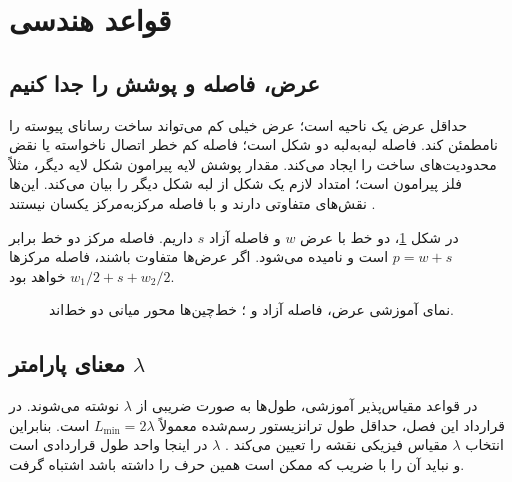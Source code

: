 \section{قواعد هندسی }
\label{sec:layout-rules}
\subsection{عرض، فاصله و پوشش را جدا کنیم}
 حداقل عرض یک ناحیه است؛ عرض خیلی کم می‌تواند ساخت
رسانای پیوسته را نامطمئن کند.
 فاصله لبه‌به‌لبه دو شکل است؛ فاصله کم خطر اتصال
ناخواسته یا نقض محدودیت‌های ساخت را ایجاد می‌کند.
 مقدار پوشش لایه پیرامون شکل لایه دیگر، مثلاً فلز پیرامون
 است؛  امتداد لازم یک شکل از لبه شکل دیگر را بیان می‌کند.
این‌ها نقش‌های متفاوتی دارند و با فاصله مرکزبه‌مرکز یکسان نیستند
\cite[بخش ]{weste}.

در شکل \ref{fig:layout-spacing}، دو خط با عرض \(w\) و فاصله آزاد \(s\)
داریم. فاصله مرکز دو خط برابر \(p=w+s\) است و  نامیده می‌شود.
اگر عرض‌ها متفاوت باشند، فاصله مرکزها \(w_1/2+s+w_2/2\) خواهد بود.

\begin{figure}[ht]
\centering
\begin{latin}
\end{latin}
\caption{نمای آموزشی عرض، فاصله آزاد و ؛ خط‌چین‌ها محور میانی دو خط‌اند.}
\label{fig:layout-spacing}
\end{figure}

\subsection{معنای پارامتر \texorpdfstring{\(\lambda\)}{lambda}}
در قواعد مقیاس‌پذیر آموزشی، طول‌ها به صورت ضریبی از \(\lambda\) نوشته می‌شوند.
در قرارداد این فصل، حداقل طول ترانزیستور رسم‌شده معمولاً \(L_{\min}=2\lambda\)
است. بنابراین انتخاب \(\lambda\) مقیاس فیزیکی نقشه را تعیین می‌کند
\cite[صفحات چاپی ۲۴ و ۲۵]{weste}.
\(\lambda\) در اینجا واحد طول قراردادی است و نباید آن را با ضریب
 که ممکن است همین حرف را داشته باشد اشتباه گرفت.

